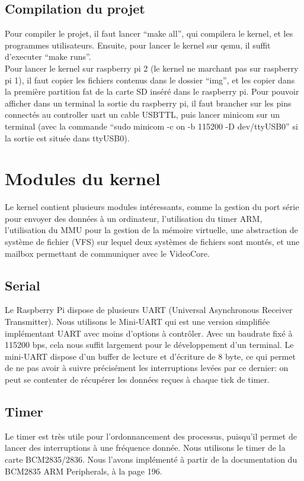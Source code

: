 \documentclass[a4paper]{article}
\begin{document}
\subsection{Compilation du projet}

Pour compiler le projet, il faut lancer ``make all'', qui compilera le kernel,
et les programmes utilisateurs. Ensuite, pour lancer le kernel sur qemu, il
suffit d'executer ``make runs''.\\

Pour lancer le kernel sur raspberry pi 2 (le
kernel ne marchant pas sur raspberry pi 1), il faut copier les fichiers contenus
dans le dossier ``img'', et les copier dans la première partition fat de la
carte SD inséré dans le raspberry pi. Pour pouvoir afficher dans un terminal la
sortie du raspberry pi, il faut brancher sur les pins connectés au controller
uart un cable USBTTL, puis lancer minicom sur un terminal (avec la commande
``sudo minicom -c on -b 115200 -D dev/ttyUSB0'' si la sortie est située dans
ttyUSB0).


\section{Modules du kernel}
Le kernel contient plusieurs modules intéressants, comme la gestion du port série
pour envoyer des données à un ordinateur, l'utilisation du timer ARM,
l'utilisation du MMU pour la gestion de la mémoire virtuelle, une abstraction de
système de fichier (VFS) sur lequel deux systèmes de fichiers sont montés, et
une mailbox permettant de communiquer avec le VideoCore.

\subsection{Serial}
Le Raspberry Pi dispose de plusieurs UART (Universal Asynchronous Receiver Transmitter).
Nous utilisons le Mini-UART qui est une version simplifiée implémentant UART avec
moins d'options à contrôler. Avec un baudrate fixé à 115200 bps, cela nous suffit
largement pour le développement d'un terminal.
Le mini-UART dispose d'un buffer de lecture et d'écriture de 8 byte, ce qui permet
de ne pas avoir à suivre précisément les interruptions levées par ce dernier:
on peut se contenter de récupérer les données reçues à chaque tick de timer.

\subsection{Timer}
Le timer est très utile pour l'ordonnancement des processus, puisqu'il permet de
lancer des interruptions à une fréquence donnée. Nous utilisons le timer de la
carte BCM2835/2836. Nous l'avons implémenté à partir de la documentation du
BCM2835 ARM Peripherals, à la page 196.\\
\end{document}
